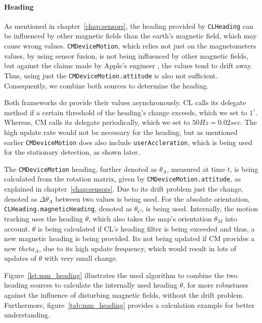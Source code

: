 \paragraph{Heading}
As mentioned in chapter~\ref{chap:sensors}, the heading provided by \texttt{CLHeading} can be influenced by other magnetic fields than the earth's magnetic field, which may cause wrong values. \texttt{CMDeviceMotion}, which relies not just on the magnetometers values, by using sensor fusion, is not being influenced by other magnetic fields, but against the claims made by Apple's engineer \citet{apple:wwdc_2012_pham}, the values tend to drift away. Thus, using just the \texttt{CMDeviceMotion.attitude} is also not sufficient. Consequently, we combine both sources to determine the heading.

Both frameworks do provide their values asynchronously. \acs{CL} calls its delegate method if a certain threshold of the heading's change exceeds, which we set to $1^\circ$. Whereas, \acs{CM} calls its delegate periodically, which we set to $50 Hz = 0.02 sec$. The high update rate would not be necessary for the heading, but as mentioned earlier \texttt{CMDeviceMotion} does also include \texttt{userAccleration}, which is being used for the stationary detection, as shown later.

The \texttt{CMDeviceMotion} heading, further denoted as $\theta_A$, measured at time $t$, is being calculated from the rotation matrix, given by \texttt{CMDeviceMotion.attitude}, as explained in chapter~\ref{chap:sensors}. Due to its drift problem just the change, denoted as $\Delta\theta_A$ between two values is being used. For the absolute orientation, \texttt{CLHeading.magneticHeading}, denoted as $\theta_C$, is being used. Internally, the motion tracking uses the heading $\theta$, which also takes the map's orientation $\theta_M$ into account. $\theta$ is being calculated if \acs{CL}'s heading filter is being exceeded and thus, a new magnetic heading is being provided. Its not being updated if \acs{CM} provides a new $theta_A$, due to its high update frequency, which would result in lots of updates of $\theta$ with very small change.

Figure~\ref{lst:mm_heading} illustrates the used algorithm to combine the two heading sources to calculate the internally used heading $\theta$, for more robustness against the influence of disturbing magnetic fields, without the drift problem. Furthermore, figure~\ref{tab:mm_heading} provides a calculation example for better understanding.

